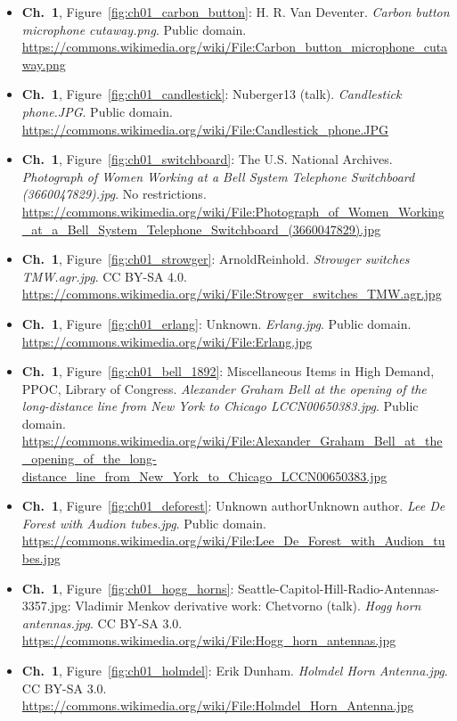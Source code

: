 \begin{small}
\begin{itemize}[leftmargin=0pt,itemsep=2pt,label={}]
\item \textbf{Ch.~1}, Figure~\ref{fig:ch01_carbon_button}: H. R. Van Deventer. \emph{Carbon button microphone cutaway.\allowbreak{}png}. Public domain. \url{https://commons.wikimedia.org/wiki/File:Carbon_button_microphone_cutaway.png}
\item \textbf{Ch.~1}, Figure~\ref{fig:ch01_candlestick}: Nuberger13 (talk). \emph{Candlestick phone.\allowbreak{}JPG}. Public domain. \url{https://commons.wikimedia.org/wiki/File:Candlestick_phone.JPG}
\item \textbf{Ch.~1}, Figure~\ref{fig:ch01_switchboard}: The U.S. National Archives. \emph{Photograph of Women Working at a Bell System Telephone Switchboard (3660047829).\allowbreak{}jpg}. No restrictions. \url{https://commons.wikimedia.org/wiki/File:Photograph_of_Women_Working_at_a_Bell_System_Telephone_Switchboard_(3660047829).jpg}
\item \textbf{Ch.~1}, Figure~\ref{fig:ch01_strowger}: ArnoldReinhold. \emph{Strowger switches TMW.\allowbreak{}agr.\allowbreak{}jpg}. CC BY-SA 4.0. \url{https://commons.wikimedia.org/wiki/File:Strowger_switches_TMW.agr.jpg}
\item \textbf{Ch.~1}, Figure~\ref{fig:ch01_erlang}: Unknown. \emph{Erlang.\allowbreak{}jpg}. Public domain. \url{https://commons.wikimedia.org/wiki/File:Erlang.jpg}
\item \textbf{Ch.~1}, Figure~\ref{fig:ch01_bell_1892}: Miscellaneous Items in High Demand, PPOC, Library of Congress. \emph{Alexander Graham Bell at the opening of the long-\allowbreak{}distance line from New York to Chicago LCCN00650383.\allowbreak{}jpg}. Public domain. \url{https://commons.wikimedia.org/wiki/File:Alexander_Graham_Bell_at_the_opening_of_the_long-distance_line_from_New_York_to_Chicago_LCCN00650383.jpg}
\item \textbf{Ch.~1}, Figure~\ref{fig:ch01_deforest}: Unknown authorUnknown author. \emph{Lee De Forest with Audion tubes.\allowbreak{}jpg}. Public domain. \url{https://commons.wikimedia.org/wiki/File:Lee_De_Forest_with_Audion_tubes.jpg}
\item \textbf{Ch.~1}, Figure~\ref{fig:ch01_hogg_horns}: Seattle-Capitol-Hill-Radio-Antennas-3357.jpg: Vladimir Menkov derivative work: Chetvorno (talk). \emph{Hogg horn antennas.\allowbreak{}jpg}. CC BY-SA 3.0. \url{https://commons.wikimedia.org/wiki/File:Hogg_horn_antennas.jpg}
\item \textbf{Ch.~1}, Figure~\ref{fig:ch01_holmdel}: Erik Dunham. \emph{Holmdel Horn Antenna.\allowbreak{}jpg}. CC BY-SA 3.0. \url{https://commons.wikimedia.org/wiki/File:Holmdel_Horn_Antenna.jpg}

\end{itemize}
\end{small}
